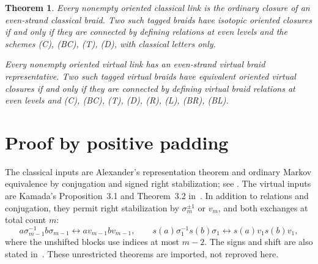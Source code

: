 \documentclass[11pt]{article}
\newtheorem{theorem}{Theorem}
\newcommand{\sig}{\sigma}
\newcommand{\arr}{\longleftrightarrow}
\begin{document}
\begin{theorem}\label{main}
Every nonempty oriented classical link is the ordinary closure of an even-strand
classical braid. Two such tagged braids have isotopic oriented closures if and
only if they are connected by defining relations at even levels and the schemes
(C), (BC), (T), (D), with classical letters only.

Every nonempty oriented virtual link has an even-strand virtual braid
representative. Two such tagged virtual braids have equivalent oriented virtual
closures if and only if they are connected by defining virtual braid relations
at even levels and (C), (BC), (T), (D), (R), (L), (BR), (BL).
\end{theorem}

\section{Proof by positive padding}
The classical inputs are Alexander's representation theorem and ordinary
Markov equivalence by conjugation and signed right stabilization; see
\cite[Theorems~2.1--2.2]{GKS}. The virtual inputs are Kamada's
Proposition~3.1 and Theorem~3.2 in~\cite{Kamada}. In addition to relations and
conjugation, they permit right stabilization by $\sig_m^{\pm1}$ or $v_m$,
and both exchanges at total count $m$:
\begin{equation}\label{unrestricted-exchange}
 a\sig_{m-1}^{-1}b\sig_{m-1}\arr av_{m-1}bv_{m-1},\qquad
 s(a)\sig_1^{-1}s(b)\sig_1\arr s(a)v_1s(b)v_1,
\end{equation}
where the unshifted blocks use indices at most $m-2$.
The signs and shift are also stated in~\cite[\S5, p.~30]{KL}.
These unrestricted theorems are imported, not reproved here.
\end{document}
